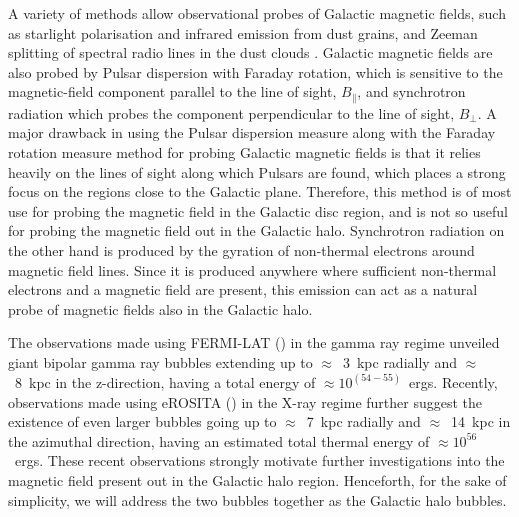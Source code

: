 \documentclass[usenatbib]{mnras}
\begin{document}
A variety of methods allow observational probes of Galactic magnetic fields, such as starlight polarisation and infrared emission from dust grains, and Zeeman splitting of spectral radio lines in the dust clouds \citep{Beck_2007}. Galactic magnetic fields are also probed by Pulsar dispersion with Faraday rotation, which is sensitive to the magnetic-field component parallel to the line of sight, $B_{\parallel}$, and synchrotron radiation which probes the component perpendicular to the line of sight, $B_{\perp}$. A major drawback in using the Pulsar dispersion measure along with the Faraday rotation measure method for probing Galactic magnetic fields is that it relies heavily on the lines of sight along which Pulsars are found, which places a strong focus on the regions close to the Galactic plane. Therefore, this method is of most use for probing the magnetic field in the Galactic disc region, and is not so useful for probing the magnetic field out in the Galactic halo. Synchrotron radiation on the other hand is produced by the gyration of non-thermal electrons around magnetic field lines. Since it is produced anywhere where sufficient non-thermal electrons and a magnetic field are present, this emission can act as a natural probe of magnetic fields also in the Galactic halo.

The observations made using FERMI-LAT (\cite{Dobler_2010, Su_2010, Su_2012}) in the gamma ray regime unveiled giant bipolar gamma ray bubbles extending up to $\approx$~3~kpc radially and $\approx$~8~kpc in the z-direction, having a total energy of $\approx 10^{(54-55)}$~ergs. Recently, observations made using eROSITA (\cite{eROSITA}) in the X-ray regime further suggest the existence of even larger bubbles going up to  $\approx$~7~kpc radially and $\approx$~14~kpc in the azimuthal direction, having an estimated total thermal energy of $\approx 10^{56}$~ergs. These recent observations strongly motivate further investigations into the magnetic field present out in the Galactic halo region. Henceforth, for the sake of simplicity, we will address the two bubbles together as the Galactic halo bubbles.
\end{document}
